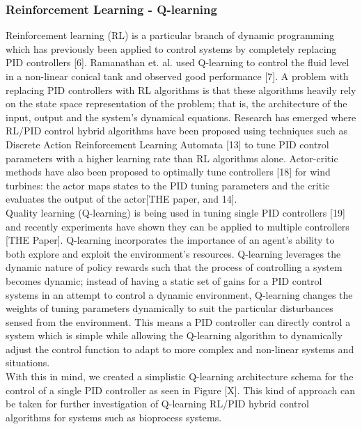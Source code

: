 \documentclass[conference]{IEEEtran}
\theoremstyle{definition}
\begin{document}
\subsubsection{Reinforcement Learning - Q-learning}
\noindent Reinforcement learning (RL) is a particular branch of dynamic programming which has previously been applied to control systems by completely replacing PID controllers [6]. Ramanathan et. al. used Q-learning to control the fluid level in a non-linear conical tank and observed good performance [7]. A problem with replacing PID controllers with RL algorithms is that these algorithms heavily rely on the state space representation of the problem; that is, the architecture of the input, output and the system's dynamical equations. 
Research has emerged where RL/PID control hybrid algorithms have been proposed using techniques such as Discrete Action Reinforcement Learning Automata [13] to tune PID control parameters with a higher learning rate than RL algorithms alone. Actor-critic methods have also been proposed to optimally tune controllers [18] for wind turbines: the actor maps states to the PID tuning parameters and the critic evaluates the output of the actor[THE paper, and 14]. \\

\noindent Quality learning (Q-learning) is being used in tuning single PID controllers [19] and recently experiments have shown they can be applied to multiple controllers [THE Paper]. Q-learning incorporates the importance of an agent's ability to both explore and exploit the environment's resources. Q-learning leverages the dynamic nature of policy rewards such that the process of controlling a system becomes dynamic; instead of having a static set of gains for a PID control systems in an attempt to control a dynamic environment, Q-learning changes the weights of tuning parameters dynamically to suit the particular disturbances sensed from the environment. This means a PID controller can directly control a system which is simple while allowing the Q-learning algorithm to dynamically adjust the control function to adapt to more complex and non-linear systems and situations. \\

\noindent With this in mind, we created a simplistic Q-learning architecture schema for the control of a single PID controller as seen in Figure [X]. This kind of approach can be taken for further investigation of Q-learning RL/PID hybrid control algorithms for systems such as bioprocess systems.
\begin{figure}[h]
    \caption{\lipsum[2]}
    \label{q-learning}
\end{figure}
\end{document}

